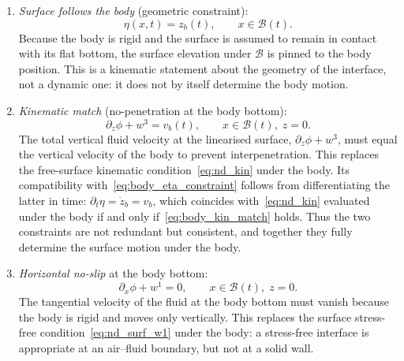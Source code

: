 \documentclass{article}
\begin{document}
\begin{enumerate}
    \item \emph{Surface follows the body} (geometric constraint):
    \begin{equation}
        \eta(x, t) = z_b(t), \qquad x \in \mathcal{B}(t). \label{eq:body_eta_constraint}
    \end{equation}
    Because the body is rigid and the surface is assumed to remain in contact with its flat bottom, the surface elevation under $\mathcal{B}$ is pinned to the body position.
    This is a kinematic statement about the geometry of the interface, not a dynamic one: it does not by itself determine the body motion.

    \item \emph{Kinematic match} (no-penetration at the body bottom):
    \begin{equation}
        \partial_z \phi + w^3 = v_b(t), \qquad x \in \mathcal{B}(t), \; z = 0. \label{eq:body_kin_match}
    \end{equation}
    The total vertical fluid velocity at the linearised surface, $\partial_z\phi + w^3$, must equal the vertical velocity of the body to prevent interpenetration.
    This replaces the free-surface kinematic condition~\eqref{eq:nd_kin} under the body.
    Its compatibility with~\eqref{eq:body_eta_constraint} follows from differentiating the latter in time: $\partial_t \eta = \dot{z}_b = v_b$, which coincides with~\eqref{eq:nd_kin} evaluated under the body if and only if~\eqref{eq:body_kin_match} holds.
    Thus the two constraints are not redundant but consistent, and together they fully determine the surface motion under the body.

    \item \emph{Horizontal no-slip} at the body bottom:
    \begin{equation}
        \partial_x \phi + w^1 = 0, \qquad x \in \mathcal{B}(t), \; z = 0. \label{eq:body_noslip}
    \end{equation}
    The tangential velocity of the fluid at the body bottom must vanish because the body is rigid and moves only vertically.
    This replaces the surface stress-free condition~\eqref{eq:nd_surf_w1} under the body: a stress-free interface is appropriate at an air--fluid boundary, but not at a solid wall.
\end{enumerate}
\end{document}
